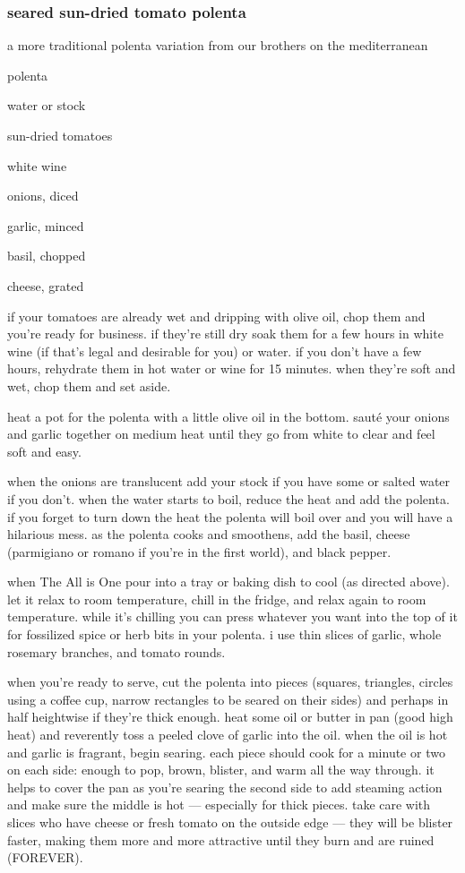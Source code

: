 \subsubsection{seared sun-dried tomato polenta}

a more traditional polenta variation from our brothers on the mediterranean

\begin{ingredients}
  \item polenta
  \item water or stock
  \item sun-dried tomatoes
  \item white wine
  \item onions, diced
  \item garlic, minced
  \item basil, chopped
  \item cheese, grated
\end{ingredients}

if your tomatoes are already wet and dripping with olive oil, chop them and 
you're ready for business. if they're still dry soak them for a few hours in 
white wine (if that's legal and desirable for you) or water. if you don't have 
a few hours, rehydrate them in hot water or wine for 15 minutes. when they're 
soft and wet, chop them and set aside.

heat a pot for the polenta with a little olive oil in the bottom. saut\'{e} 
your onions and garlic together on medium heat until they go from white to 
clear and feel soft and easy.

when the onions are translucent add your stock if you have some or salted 
water if you don't. when the water starts to boil, reduce the heat and add the 
polenta. if you forget to turn down the heat the polenta will boil over and 
you will have a hilarious mess. as the polenta cooks and smoothens, add the 
basil, cheese (parmigiano or romano if you're in the first world), and black 
pepper.

when The All is One pour into a tray or baking dish to cool (as directed 
above). let it relax to room temperature, chill in the fridge, and relax again 
to room temperature. while it's chilling you can press whatever you want into 
the top of it for fossilized spice or herb bits in your polenta. i use thin 
slices of garlic, whole rosemary branches, and tomato rounds.

when you're ready to serve, cut the polenta into pieces (squares, triangles, 
circles using a coffee cup, narrow rectangles to be seared on their sides) 
and perhaps in half heightwise if they're thick enough. heat some oil or 
butter in pan (good high heat) and reverently toss a peeled clove of garlic 
into the oil. when the oil is hot and garlic is fragrant, begin searing. each 
piece should cook for a minute or two on each side: enough to pop, brown, 
blister, and warm all the way through. it helps to cover the pan as you're 
searing the second side to add steaming action and make sure the middle is 
hot --- especially for thick pieces. take care with slices who have cheese or 
fresh tomato on the outside edge --- they will be blister faster, making them 
more and more attractive until they burn and are ruined (FOREVER).


